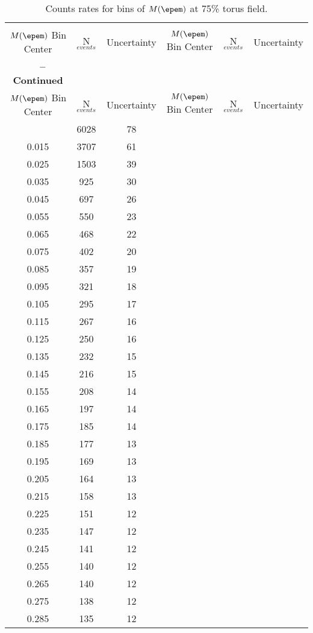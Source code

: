 \large
\begin{center}
\begin{longtable}{c|c|c||c|c|c}
\caption[Expected count rates]{Counts rates for bins of $M(\epem)$ at 75\% torus field.}\label{tab:counts} \vspace{0.75mm}\\
$M(\epem)$ Bin Center & N$_{events}$ & Uncertainty & $M(\epem)$ Bin Center & N$_{events}$ & Uncertainty  \\
\hline
\endfirsthead
{{\bfseries \tablename\ \thetable{} -- Continued }}\\
$M(\epem)$ Bin Center & N$_{events}$ & Uncertainty & $M(\epem)$ Bin Center & N$_{events}$ & Uncertainty  \\
\hline
\endhead
\hline
\endfoot
\hline
\endlastfoot
\hline
0.005 & 6028 & 78\\
0.015 & 3707 & 61\\
0.025 & 1503 & 39\\
0.035 & 925 & 30\\
0.045 & 697 & 26\\
0.055 & 550 & 23\\
0.065 & 468 & 22\\
0.075 & 402 & 20\\
0.085 & 357 & 19\\
0.095 & 321 & 18\\
0.105 & 295 & 17\\
0.115 & 267 & 16\\
0.125 & 250 & 16\\
0.135 & 232 & 15\\
0.145 & 216 & 15\\
0.155 & 208 & 14\\
0.165 & 197 & 14\\
0.175 & 185 & 14\\
0.185 & 177 & 13\\
0.195 & 169 & 13\\
0.205 & 164 & 13\\
0.215 & 158 & 13\\
0.225 & 151 & 12\\
0.235 & 147 & 12\\
0.245 & 141 & 12\\
0.255 & 140 & 12\\
0.265 & 140 & 12\\
0.275 & 138 & 12\\
0.285 & 135 & 12\\

\end{longtable}
\end{center}
